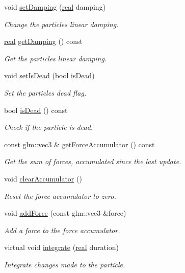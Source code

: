 \begin{DoxyCompactItemize}
void \mbox{\hyperlink{classr3_1_1_particle_a5a7d9ff7821fd5755317ec877f66e8f6}{set\+Damping}} (\mbox{\hyperlink{namespacer3_ab2016b3e3f743fb735afce242f0dc1eb}{real}} damping)
\begin{DoxyCompactList}\small\item\em Change the particle\textquotesingle{}s linear damping. \end{DoxyCompactList}\item 
\mbox{\hyperlink{namespacer3_ab2016b3e3f743fb735afce242f0dc1eb}{real}} \mbox{\hyperlink{classr3_1_1_particle_a5e8544a8ac8e4765a9021f9112209eba}{get\+Damping}} () const
\begin{DoxyCompactList}\small\item\em Get the particle\textquotesingle{}s linear damping. \end{DoxyCompactList}\item 
void \mbox{\hyperlink{classr3_1_1_particle_a1f0b0ac6f094025e02359026c681350f}{set\+Is\+Dead}} (bool \mbox{\hyperlink{classr3_1_1_particle_aeeb9dd636d0851bc007ff718ef9140e9}{is\+Dead}})
\begin{DoxyCompactList}\small\item\em Set the particle\textquotesingle{}s dead flag. \end{DoxyCompactList}\item 
bool \mbox{\hyperlink{classr3_1_1_particle_aeeb9dd636d0851bc007ff718ef9140e9}{is\+Dead}} () const
\begin{DoxyCompactList}\small\item\em Check if the particle is dead. \end{DoxyCompactList}\item 
const glm\+::vec3 \& \mbox{\hyperlink{classr3_1_1_particle_a81fe0cfac976df7da6337dabc8f73313}{get\+Force\+Accumulator}} () const
\begin{DoxyCompactList}\small\item\em Get the sum of forces, accumulated since the last update. \end{DoxyCompactList}\item 
void \mbox{\hyperlink{classr3_1_1_particle_a1ba9a33fb4513cf79eb8bf4954ec6b97}{clear\+Accumulator}} ()
\begin{DoxyCompactList}\small\item\em Reset the force accumulator to zero. \end{DoxyCompactList}\item 
void \mbox{\hyperlink{classr3_1_1_particle_a18bc9d9ded382879086eb2820ce787c9}{add\+Force}} (const glm\+::vec3 \&force)
\begin{DoxyCompactList}\small\item\em Add a force to the force accumulator. \end{DoxyCompactList}\item 
virtual void \mbox{\hyperlink{classr3_1_1_particle_aff134984d9bc7409579e16eca3e42b68}{integrate}} (\mbox{\hyperlink{namespacer3_ab2016b3e3f743fb735afce242f0dc1eb}{real}} duration)
\begin{DoxyCompactList}\small\item\em Integrate changes made to the particle. \end{DoxyCompactList}\end{DoxyCompactItemize}
